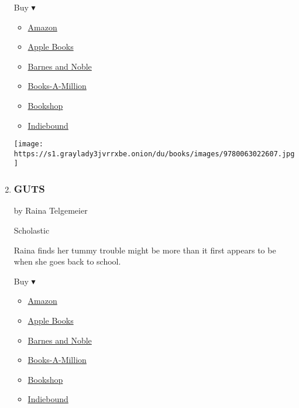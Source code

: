 \begin{enumerate}
  Buy ▾

  \begin{itemize}
  \tightlist
  \item
    \href{https://www.amazon.com/dp/0063022605?tag=NYTBSREV-20\&tag=NYTBS-20}{Amazon}
  \item
    \href{https://du-gae-books-dot-nyt-du-prd.appspot.com/buy?title=STRANGER+PLANET\&author=Nathan+W+Pyle}{Apple
    Books}
  \item
    \href{https://www.anrdoezrs.net/click-7990613-11819508?url=https\%3A\%2F\%2Fwww.barnesandnoble.com\%2Fw\%2F\%3Fean\%3D9780063022607}{Barnes
    and Noble}
  \item
    \href{https://www.anrdoezrs.net/click-7990613-35140?url=https\%3A\%2F\%2Fwww.booksamillion.com\%2Fp\%2FSTRANGER\%2BPLANET\%2FNathan\%2BW\%2BPyle\%2F9780063022607}{Books-A-Million}
  \item
    \href{https://bookshop.org/a/3546/9780063022607}{Bookshop}
  \item
    \href{https://www.indiebound.org/book/9780063022607?aff=NYT}{Indiebound}
  \end{itemize}

  \texttt{[image: https://s1.graylady3jvrrxbe.onion/du/books/images/9780063022607.jpg]}
\item
  \hypertarget{guts}{%
  \subsubsection{GUTS}\label{guts}}

  by Raina Telgemeier

  Scholastic

  Raina finds her tummy trouble might be more than it first appears to
  be when she goes back to school.

  Buy ▾

  \begin{itemize}
  \tightlist
  \item
    \href{https://www.amazon.com/Guts-Raina-Telgemeier/dp/0545852501?tag=NYTBS-20}{Amazon}
  \item
    \href{https://du-gae-books-dot-nyt-du-prd.appspot.com/buy?title=GUTS\&author=Raina+Telgemeier}{Apple
    Books}
  \item
    \href{https://www.anrdoezrs.net/click-7990613-11819508?url=https\%3A\%2F\%2Fwww.barnesandnoble.com\%2Fw\%2F\%3Fean\%3D9780545852500}{Barnes
    and Noble}
  \item
    \href{https://www.anrdoezrs.net/click-7990613-35140?url=https\%3A\%2F\%2Fwww.booksamillion.com\%2Fp\%2FGUTS\%2FRaina\%2BTelgemeier\%2F9780545852500}{Books-A-Million}
  \item
    \href{https://bookshop.org/a/3546/9780545852500}{Bookshop}
  \item
    \href{https://www.indiebound.org/book/9780545852500?aff=NYT}{Indiebound}
  \end{itemize}


\end{enumerate}

